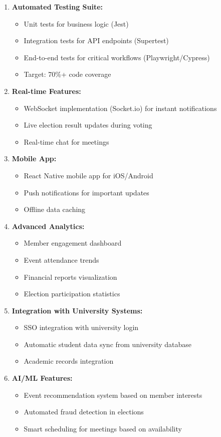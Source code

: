 \documentclass[12pt,a4paper]{article}
\begin{document}
\begin{enumerate}[noitemsep]
  \item \textbf{Automated Testing Suite:}
  \begin{itemize}[noitemsep]
    \item Unit tests for business logic (Jest)
    \item Integration tests for API endpoints (Supertest)
    \item End-to-end tests for critical workflows (Playwright/Cypress)
    \item Target: 70\%+ code coverage
  \end{itemize}
  
  \item \textbf{Real-time Features:}
  \begin{itemize}[noitemsep]
    \item WebSocket implementation (Socket.io) for instant notifications
    \item Live election result updates during voting
    \item Real-time chat for meetings
  \end{itemize}
  
  \item \textbf{Mobile App:}
  \begin{itemize}[noitemsep]
    \item React Native mobile app for iOS/Android
    \item Push notifications for important updates
    \item Offline data caching
  \end{itemize}
  
  \item \textbf{Advanced Analytics:}
  \begin{itemize}[noitemsep]
    \item Member engagement dashboard
    \item Event attendance trends
    \item Financial reports visualization
    \item Election participation statistics
  \end{itemize}
  
  \item \textbf{Integration with University Systems:}
  \begin{itemize}[noitemsep]
    \item SSO integration with university login
    \item Automatic student data sync from university database
    \item Academic records integration
  \end{itemize}
  
  \item \textbf{AI/ML Features:}
  \begin{itemize}[noitemsep]
    \item Event recommendation system based on member interests
    \item Automated fraud detection in elections
    \item Smart scheduling for meetings based on availability
  \end{itemize}
\end{enumerate}
\end{document}
